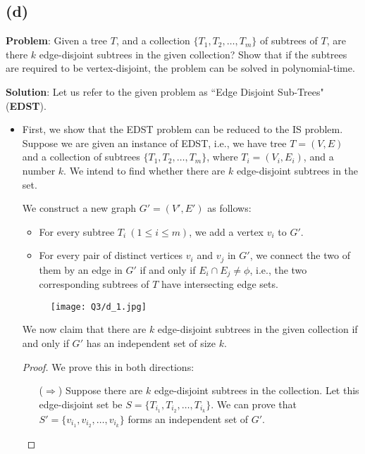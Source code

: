 \documentclass[11pt, fleqn]{article}
\begin{document}
\newpage

\subsection*{(d)}

\textbf{Problem}: Given a tree $T$, and a collection $\{T_1, T_2, \dots, T_m\}$ of subtrees of $T$, are there $k$ edge-disjoint subtrees in the given collection? Show that if the subtrees are required to be vertex-disjoint, the problem can be solved in polynomial-time.

\bigskip

\textbf{Solution}: Let us refer to the given problem as ``Edge Disjoint Sub-Trees" (\textbf{EDST}).

\begin{itemize}
    \item First, we show that the EDST problem can be reduced to the IS problem. Suppose we are given an instance of EDST, i.e., we have tree $T = (V, E)$ and a collection of subtrees $\{T_1, T_2, \dots, T_m\}$, where $T_i = (V_i, E_i)$, and a number $k$. We intend to find whether there are $k$ edge-disjoint subtrees in the set.
    
    We construct a new graph $G' = (V', E')$ as follows:
    \begin{itemize}
        \item For every subtree $T_i \ (1 \leq i \leq m)$, we add a vertex $v_i$ to $G'$.
        \item For every pair of distinct vertices $v_i$ and $v_j$ in $G'$, we connect the two of them by an edge in $G'$ if and only if $E_i \cap E_j \neq \phi$, i.e., the two corresponding subtrees of $T$ have intersecting edge sets.
    \end{itemize}
    \begin{figure}[H]
        \texttt{[image: Q3/d\_1.jpg]}
    \end{figure}
    
    We now claim that there are $k$ edge-disjoint subtrees in the given collection if and only if $G'$ has an independent set of size $k$.
    \begin{proof}
        We prove this in both directions:
        \begin{itemize}
            \item[($\Rightarrow$)]
            Suppose there are $k$ edge-disjoint subtrees in the collection. Let this edge-disjoint set be $S = \{T_{i_1}, T_{i_2}, \dots, T_{i_k}\}$. We can prove that $S' = \{v_{i_1}, v_{i_2}, \dots, v_{i_k}\}$ forms an independent set of $G'$.
            

\end{itemize}
\end{proof}
\end{itemize}
\end{document}
